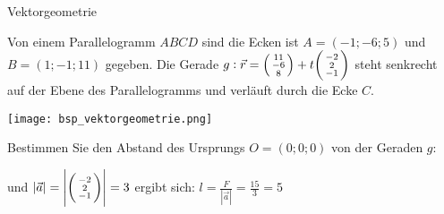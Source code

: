 \columnbreak

\begin{example2}[breakable]{Vektorgeometrie}

    Von einem Parallelogramm $A B C D$ sind die Ecken ist $A=(-1 ;-6 ; 5)$ und $B=(1 ;-1 ; 11)$ gegeben. Die Gerade $g: \vec{r}=\begin{psmallmatrix}11 \\ -6 \\ 8\end{psmallmatrix}+t\begin{psmallmatrix}-2 \\ 2 \\ -1\end{psmallmatrix}$ steht senkrecht auf der Ebene des Parallelogramms und verläuft durch die Ecke $C$.

    \begin{center}
        \texttt{[image: bsp\_vektorgeometrie.png]}
    \end{center}

    Bestimmen Sie den Abstand des Ursprungs $O=(0 ; 0 ; 0)$ von der Geraden $g$:


    und $|\vec{a}|=\left|\begin{psmallmatrix}-2 \\ 2 \\ -1\end{psmallmatrix}\right|=3$
    ergibt sich: $l=\frac{F}{|\vec{a}|}=\frac{15}{3}=5$

    \vspace{3mm}


\end{example2}
